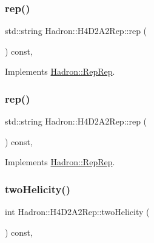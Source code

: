 \subsubsection{\texorpdfstring{rep()}{rep()}\hspace{0.1cm}{\footnotesize\ttfamily [2/3]}}
{\footnotesize\ttfamily std\+::string Hadron\+::\+H4\+D2\+A2\+Rep\+::rep (\begin{DoxyParamCaption}{ }\end{DoxyParamCaption}) const\hspace{0.3cm}{\ttfamily [inline]}, {\ttfamily [virtual]}}



Implements \mbox{\hyperlink{structHadron_1_1RepRep_ab3213025f6de249f7095892109575fde}{Hadron\+::\+Rep\+Rep}}.

\mbox{\label{structHadron_1_1H4D2A2Rep_a144c2d98d82e71971a810610f10199d3}} 
\subsubsection{\texorpdfstring{rep()}{rep()}\hspace{0.1cm}{\footnotesize\ttfamily [3/3]}}
{\footnotesize\ttfamily std\+::string Hadron\+::\+H4\+D2\+A2\+Rep\+::rep (\begin{DoxyParamCaption}{ }\end{DoxyParamCaption}) const\hspace{0.3cm}{\ttfamily [inline]}, {\ttfamily [virtual]}}



Implements \mbox{\hyperlink{structHadron_1_1RepRep_ab3213025f6de249f7095892109575fde}{Hadron\+::\+Rep\+Rep}}.

\mbox{\label{structHadron_1_1H4D2A2Rep_a2d246b554a8500cb82a99cd8139bf313}} 
\subsubsection{\texorpdfstring{twoHelicity()}{twoHelicity()}\hspace{0.1cm}{\footnotesize\ttfamily [1/2]}}
{\footnotesize\ttfamily int Hadron\+::\+H4\+D2\+A2\+Rep\+::two\+Helicity (\begin{DoxyParamCaption}{ }\end{DoxyParamCaption}) const\hspace{0.3cm}{\ttfamily [inline]}, {\ttfamily [virtual]}}

